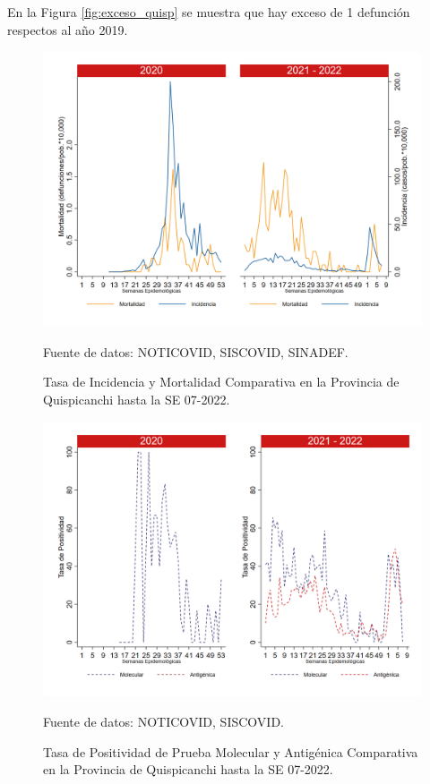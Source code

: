 \documentclass[12pt,a4paper,openany]{book}
\begin{document}
	En la Figura \ref{fig:exceso_quisp} se muestra que hay exceso de 1 defunción respectos al año 2019.
		
		\begin{figure}[h]
			\caption{Tasa de Incidencia y Mortalidad Comparativa en la Provincia de Quispicanchi hasta la SE 07-2022.}\label{fig:inc_mort_quisp}
			\begin{center}
				\includegraphics[width=0.85\linewidth]{../figuras/incidencia_mortalidad_20_21_12.png}
			\end{center}
			{\footnotesize {Fuente de datos: NOTICOVID, SISCOVID, SINADEF.}}
		\end{figure}
		
		\begin{figure}[h]
			\caption{Tasa de Positividad de Prueba Molecular y Antigénica Comparativa en la Provincia de Quispicanchi hasta la SE 07-2022.}\label{fig:positividad_quisp}
			\begin{center}
				\includegraphics[width=0.7\linewidth]{../figuras/positividad_20_21_12.png}
			\end{center}
			{\footnotesize {Fuente de datos: NOTICOVID, SISCOVID.}}
		\end{figure}
		
\end{document}
